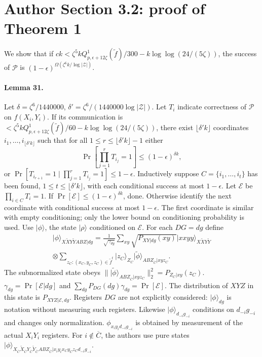 \documentclass[10pt,a4paper]{article}
\providecommand{\ket}[1]{\lvert#1\rangle}
\begin{document}
\section*{Author Section 3.2: proof of Theorem 1}
We show that if $ck<\zeta^5kQ^1_{p,\epsilon+12\zeta}(\widetilde f)/300-k\log\log(24/(5\zeta))$, the success of $\mathcal P$ is $(1-\epsilon)^{\Omega(\zeta^6k/\log|\mathcal Z|)}$.
\paragraph{Lemma 31.} Let $\delta=\zeta^6/1440000$, $\delta'=\zeta^6/(1440000\log|\mathcal Z|)$. Let $T_i$ indicate correctness of $\mathcal P$ on $f(X_i,Y_i)$. If its communication is $<\zeta^5kQ^1_{p,\epsilon+12\zeta}(\widetilde f)/60-k\log\log(24/(5\zeta))$, there exist $\lfloor\delta'k\rfloor$ coordinates $i_1,\ldots,i_{\lfloor\delta'k\rfloor}$ such that for all $1\le r\le\lfloor\delta'k\rfloor-1$ either
\[\Pr[\prod_{j=1}^rT_{i_j}=1]\le(1-\epsilon)^{\delta k},\]
or $\Pr[T_{i_{r+1}}=1\mid\prod_{j=1}^rT_{i_j}=1]\le1-\epsilon$.
Inductively suppose $C=\{i_1,\ldots,i_t\}$ has been found, $1\le t\le\lfloor\delta'k\rfloor$, with each conditional success at most $1-\epsilon$. Let $\mathcal E$ be $\prod_{i\in C}T_i=1$. If $\Pr[\mathcal E]\le(1-\epsilon)^{\delta k}$, done. Otherwise identify the next coordinate with conditional success at most $1-\epsilon$. The first coordinate is similar with empty conditioning; only the lower bound on conditioning probability is used.
Use $\ket\phi$, the state $\ket\rho$ conditioned on $\mathcal E$. For each $DG=dg$ define
\begin{multline*}\ket\phi_{X\widetilde XY\widetilde YABZ|dg}=\frac1{\sqrt{\gamma_{dg}}}\sum_{xy}\sqrt{P_{XY|dg}(xy)}\ket{xxyy}_{X\widetilde XY\widetilde Y}\\\otimes\sum_{z_C:(x_C,y_C,z_C)\in\widetilde f^t}\ket{z_C}_{Z_C}\ket{\widetilde\phi}_{ABZ_{\overline C}|xyz_C}.
\end{multline*}
The subnormalized state obeys $\|\ket{\widetilde\phi}_{ABZ_{\overline C}|xyz_C}\|_2^2=P_{Z_C|xy}(z_C)$. $\gamma_{dg}=\Pr[\mathcal E|dg]$ and $\sum_{dg}P_{DG}(dg)\gamma_{dg}=\Pr[\mathcal E]$. The distribution of $XYZ$ in this state is $P_{XYZ|\mathcal E,dg}$. Registers $DG$ are not explicitly considered: $\ket\phi_{dg}$ is notation without measuring such registers. Likewise $\ket\phi_{d_{-i}g_{-i}}$ conditions on $d_{-i}g_{-i}$ and changes only normalization. $\phi_{x_iy_id_{-i}g_{-i}}$ is obtained by measurement of the actual $X_iY_i$ registers. For $i\notin\overline C$, the authors use pure states $\ket\phi_{X_{\overline C}\widetilde X_{\overline C}Y_{\overline C}\widetilde Y_{\overline C}ABZ_{\overline C}|x_iy_ix_Cy_Cz_Cd_{-i}g_{-i}}$.
\end{document}
